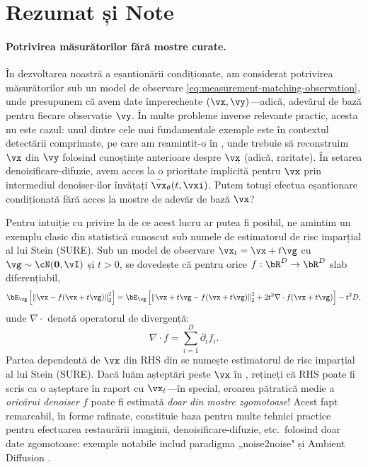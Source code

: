 \documentclass[../../book-main_ro.tex]{subfiles}
\begin{document}
\section{Rezumat și Note}
\paragraph{Potrivirea măsurătorilor fără mostre curate.} În dezvoltarea noastră a
eșantionării condiționate, am considerat potrivirea măsurătorilor sub un model
de observare \eqref{eq:measurement-matching-observation}, unde presupunem că avem
date împerecheate $(\vx, \vy)$—adică, adevărul de bază pentru fiecare observație $\vy$.
În multe probleme inverse relevante practic, acesta nu este cazul: unul dintre
cele mai fundamentale exemple este în contextul detectării comprimate, pe care am
reamintit-o în , unde trebuie să reconstruim $\vx$ din $\vy$
folosind cunoștințe anterioare despre $\vx$ (adică, raritate).
În setarea denoisificare-difuzie, avem acces la o prioritate implicită pentru
$\vx$ prin intermediul denoiser-ilor învățați $\bar{\vx}_{\theta}(t, \vxi)$. Putem totuși efectua
eșantionare condiționată fără acces la mostre de adevăr de bază $\vx$?

Pentru intuiție cu privire la de ce acest lucru ar putea fi posibil, ne amintim un exemplu clasic
din statistică cunoscut sub numele de estimatorul de risc imparțial al lui Stein (SURE).
Sub un model de observare $\vx_t = \vx + t \vg$ cu $\vg \sim \cN(\Zero,
\vI)$ și $t>0$, se dovedește că pentru orice $f : \bR^D \to \bR^D$ slab diferențiabil,
\begin{equation}\label{eq:sure-risk}
  \bE_{\vg}\left[
    \norm*{\vx - f(\vx + t \vg)}_2^2
    \right]
  =
  \bE_{\vg}\left[
    \norm*{\vx+t\vg - f(\vx + t \vg)}_2^2
    + 2t^2 \nabla \cdot f(\vx + t\vg)
    \right]
  - t^2 D,
\end{equation}
unde $\nabla \cdot$ denotă operatorul de divergență:
\begin{equation*}
	\nabla \cdot f = \sum_{i=1}^D \partial_i f_i.
\end{equation*}
Partea dependentă de $\vx$ din RHS din  se numește estimatorul
de risc imparțial al lui Stein (SURE). Dacă luăm așteptări peste $\vx$ în ,
rețineți că RHS poate fi scris ca o așteptare în raport cu $\vx_t$---în
special, eroarea pătratică medie a \textit{oricărui denoiser $f$} poate fi estimată
\textit{doar din mostre zgomotoase}!
Acest fapt remarcabil, în forme rafinate, constituie baza pentru multe tehnici
practice pentru efectuarea restaurării imaginii, denoisificare-difuzie, etc.\ folosind
doar date zgomotoase: exemple notabile includ paradigma „noise2noise"
\cite{pmlr-v80-lehtinen18a}
și Ambient Diffusion \cite{daras2023ambient}.
\end{document}
